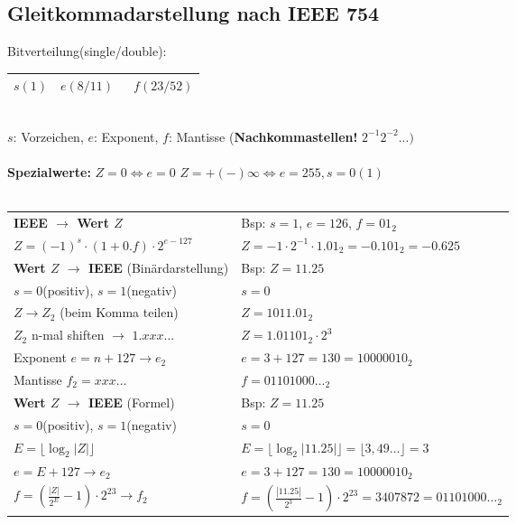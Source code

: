 \documentclass[6pt,a4paper]{scrartcl}
\newcommand{\abs}[1]{\ensuremath{\left\vert#1\right\vert}} 							%
\begin{document}
\begin{multicols*}{3}
	\subsection{Gleitkommadarstellung nach IEEE 754}
	Bitverteilung(single/double):\\
	\begin{tabular}{|c|c|c|} \hline
		$s(1)$ & \quad $e(8/11)$ \quad\qquad & \qquad\qquad\qquad\ $f(23/52)$ \qquad\qquad\qquad\qquad \\ \hline
	\end{tabular} \\[0.5em]
	$s$: Vorzeichen, $e$: Exponent, $f$: Mantisse (\textbf{Nachkommastellen!} $2^{-1}2^{-2}...)$ \\ \\
	\textbf{Spezialwerte:} $Z = 0 \Leftrightarrow e=0$ \qquad $Z = + (-)\infty \Leftrightarrow e=255, s=0(1)$ \\ \\
	\begin{tabular}{l|p{4.5cm}}
		\textbf{IEEE $\rightarrow$ Wert $Z$} & Bsp: $s = 1$, $e = 126$, $f = 01_2$\\
		$Z = (-1)^s \cdot  (1+0.f) \cdot 2^{e-127}$ & $Z=-1 \cdot 2^{-1} \cdot 1.01_2 = -0.101_2= -0.625$ \\ \midrule
		\textbf{Wert $Z$ $\rightarrow$ IEEE} (Binärdarstellung) & Bsp: $Z=11.25$ \\
		$s=0$(positiv), $s=1$(negativ) & $s=0$\\
		$Z \rightarrow Z_2$ (beim Komma teilen) & $Z = 1011.01_2$\\
		$Z_2$ n-mal shiften $\rightarrow$ $1.xxx\dots$ & $Z=1.01101_2\cdot 2^3$ \\
		Exponent $e=n+127 \rightarrow e_2$ & $e=3+127=130=10000010_2$\\
		Mantisse $f_2=xxx\dots$ & $f=01101000\dots_2$ \\ \midrule
		\textbf{Wert $Z$ $\rightarrow$ IEEE} (Formel) & Bsp: $Z=11.25$ \\
		$s=0$(positiv), $s=1$(negativ) & $s=0$\\
		$E=\lfloor \log_2\abs{Z}\rfloor$ & $E=\lfloor \log_2\abs{11.25}\rfloor=\lfloor3,49\dots\rfloor=3$\\
		$e=E+127 \rightarrow e_2$ & $e=3+127=130=10000010_2$\\
		$f=\left(\frac{\abs{Z}}{2^E}-1\right) \cdot 2^{23} \rightarrow f_2$  & $f=\left(\frac{\abs{11.25}}{2^3}-1\right)\cdot 2^{23}=3407872= 01101000\dots_2 $
	\end{tabular}

\end{multicols*}
\end{document}

